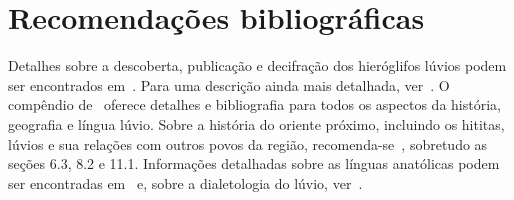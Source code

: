 \begin{center}
\end{center}

\chapter{Recomendações bibliográficas}

Detalhes sobre a descoberta, publicação e decifração dos hieróglifos lúvios
podem ser encontrados em~\citet[pp. 131ff.]{HawkinsScripts}. Para uma descrição
ainda mais detalhada, ver~\citet[pp. 6-17]{CHLI11}.
O compêndio de~\citet{Melchert2003} oferece detalhes e bibliografia para todos
os aspectos da história, geografia e língua lúvio.
Sobre a história do oriente próximo, incluindo os hititas, lúvios e sua
relações com outros povos da região, recomenda-se~\citet{Mieroop2015}, sobretudo
as seções 6.3, 8.2 e 11.1.
Informações detalhadas sobre as línguas anatólicas podem ser encontradas
em~\citet[239--308]{HSK41.1} e, sobre a dialetologia do lúvio,
ver~\citet{Yakubovich2010}.


